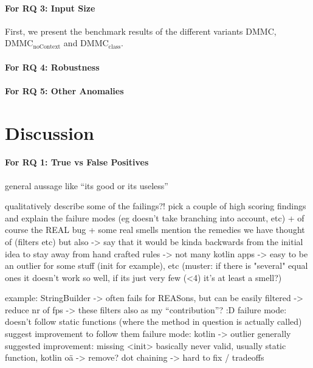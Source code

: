 
\paragraph{For RQ 3: Input Size}

First, we present the benchmark results of the different variants $\text{DMMC}$, $\text{DMMC}_\text{noContext}$ and $\text{DMMC}_\text{class}$.

\paragraph{For RQ 4: Robustness}

\paragraph{For RQ 5: Other Anomalies}


\section{Discussion}

\paragraph{For RQ 1: True vs False Positives}

general aussage like ``its good or its useless''

qualitatively describe some of the failings?! 
pick a couple of high scoring findings and explain the failure modes (eg doesn't take branching into account, etc)
+ of course the REAL bug + some real smells
mention the remedies we have thought of (filters etc) but also -> say that it would be kinda backwards from the initial idea to stay away from hand crafted rules
-> not many kotlin apps -> easy to be an outlier for some stuff (init for example), etc
(muster: if there is "several" equal ones it doesn't work so well, if its just very few (<4) it's at least a smell?)

example: StringBuilder -> often fails for REASons, but can be easily filtered -> reduce nr of fps
-> these filters also as my ``contribution''? :D 
failure mode: doesn't follow static functions (where the method in question is actually called)
    suggest improvement to follow them
failure mode: kotlin -> outlier generally
suggested improvement: missing <init> basically never valid, usually static function, kotlin oä -> remove?
dot chaining -> hard to fix / tradeoffs

